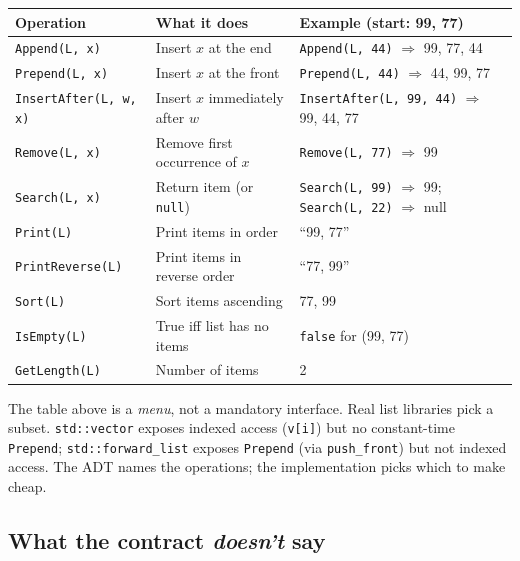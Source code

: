 \documentclass[11pt]{article}
\begin{document}
\begin{center}
\footnotesize
\renewcommand{\arraystretch}{1.3}
\begin{tabular}{@{}p{3.4cm}p{5cm}p{4.8cm}@{}}
\hline
\textbf{Operation} & \textbf{What it does} & \textbf{Example (start: 99, 77)} \\
\hline
\texttt{Append(L, x)}          & Insert $x$ at the end              & \texttt{Append(L, 44)} $\Rightarrow$ 99, 77, 44 \\
\texttt{Prepend(L, x)}         & Insert $x$ at the front            & \texttt{Prepend(L, 44)} $\Rightarrow$ 44, 99, 77 \\
\texttt{InsertAfter(L, w, x)}  & Insert $x$ immediately after $w$   & \texttt{InsertAfter(L, 99, 44)} $\Rightarrow$ 99, 44, 77 \\
\texttt{Remove(L, x)}          & Remove first occurrence of $x$     & \texttt{Remove(L, 77)} $\Rightarrow$ 99 \\
\texttt{Search(L, x)}          & Return item (or \texttt{null})     & \texttt{Search(L, 99)} $\Rightarrow$ 99; \texttt{Search(L, 22)} $\Rightarrow$ null \\
\texttt{Print(L)}              & Print items in order               & ``99, 77'' \\
\texttt{PrintReverse(L)}       & Print items in reverse order       & ``77, 99'' \\
\texttt{Sort(L)}               & Sort items ascending               & 77, 99 \\
\texttt{IsEmpty(L)}            & True iff list has no items         & \texttt{false} for (99, 77) \\
\texttt{GetLength(L)}          & Number of items                    & 2 \\
\hline
\end{tabular}
\end{center}

\begin{notebox}
The table above is a \emph{menu}, not a mandatory interface. Real
list libraries pick a subset. \texttt{std::vector} exposes indexed
access (\texttt{v[i]}) but no constant-time \texttt{Prepend};
\texttt{std::forward\_list} exposes \texttt{Prepend} (via
\texttt{push\_front}) but not indexed access. The ADT names the
operations; the implementation picks which to make cheap.
\end{notebox}

\subsection{What the contract \emph{doesn't} say}
\end{document}
